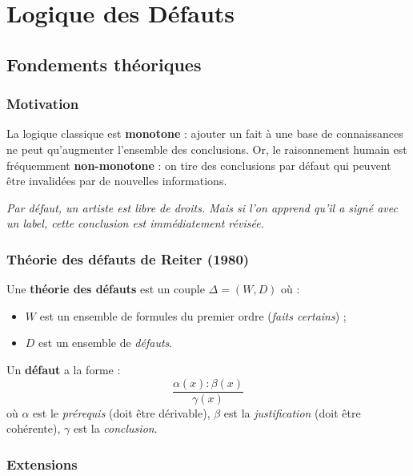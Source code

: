 \chapter{Logique des Défauts}

\section{Fondements théoriques}

\subsection{Motivation}

La logique classique est \textbf{monotone} : ajouter un fait à une base de
connaissances ne peut qu'augmenter l'ensemble des conclusions.
Or, le raisonnement humain est fréquemment \textbf{non-monotone} : on tire des
conclusions par défaut qui peuvent être invalidées par de nouvelles informations.

\begin{tcolorbox}[notebox, title={Exemple de non-monotonie}]
\textit{Par défaut, un artiste est libre de droits.
Mais si l'on apprend qu'il a signé avec un label, cette conclusion est
immédiatement révisée.}
\end{tcolorbox}

\subsection{Théorie des défauts de Reiter (1980)}

Une \textbf{théorie des défauts} est un couple $\Delta = (W, D)$ où :
\begin{itemize}
  \item $W$ est un ensemble de formules du premier ordre (\emph{faits certains}) ;
  \item $D$ est un ensemble de \emph{défauts}.
\end{itemize}

\noindent Un \textbf{défaut} a la forme :
\[
  \frac{\alpha(x) : \beta(x)}{\gamma(x)}
\]
où $\alpha$ est le \emph{prérequis} (doit être dérivable),
$\beta$ est la \emph{justification} (doit être cohérente),
$\gamma$ est la \emph{conclusion}.

\subsection{Extensions}

